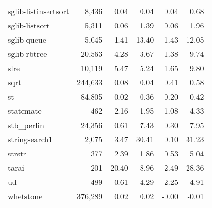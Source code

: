 \begin{table}[ptb]
{\begin{tabular}{@{}lrrrrr@{}}
sglib-listinsertsort & 8,436 & 0.04 & 0.04 & 0.04 & 0.68 \\
sglib-listsort & 5,311 & 0.06 & 1.39 & 0.06 & 1.96 \\
sglib-queue & 5,045 & -1.41 & 13.40 & -1.43 & 12.05 \\
sglib-rbtree & 20,563 & 4.28 & 3.67 & 1.38 & 9.74 \\
slre & 10,119 & 5.47 & 5.24 & 1.65 & 9.80 \\
sqrt & 244,633 & 0.08 & 0.04 & 0.41 & 0.58 \\
st & 84,805 & 0.02 & 0.36 & -0.20 & 0.42 \\
statemate & 462 & 2.16 & 1.95 & 1.08 & 4.33 \\
stb\_perlin & 24,356 & 0.61 & 7.43 & 0.30 & 7.95 \\
stringsearch1 & 2,075 & 3.47 & 30.41 & 0.10 & 31.23 \\
strstr & 377 & 2.39 & 1.86 & 0.53 & 5.04 \\
tarai & 201 & 20.40 & 8.96 & 2.49 & 28.36 \\
ud & 489 & 0.61 & 4.29 & 2.25 & 4.91 \\
whetstone & 376,289 & 0.02 & 0.02 & -0.00 & -0.01 \\
\bottomrule
\end{tabular}
}
\label{table:perf}
\end{table}
